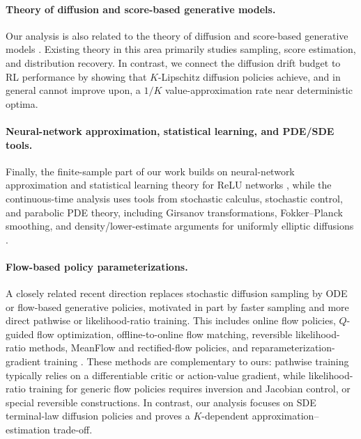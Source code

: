 \documentclass{article}
\newcommand{\1}{\mathbbm{1}}
\numberwithin{equation}{section}
\begin{document}
\paragraph{Theory of diffusion and score-based generative models.}
Our analysis is also related to the theory of diffusion and score-based
generative models
\cite{sohl2015deep, song2019generative, ho2020denoising,
song2021scorebased, tzen2019deep, deBortoli2022convergence,
lee2022convergence, chen2023sampling, chen2023score}. Existing theory in this
area primarily studies sampling, score estimation, and distribution recovery.
In contrast, we connect the diffusion drift budget to RL performance by showing
that $K$-Lipschitz diffusion policies achieve, and in general cannot improve
upon, a $1/K$ value-approximation rate near deterministic optima.




\paragraph{Neural-network approximation, statistical learning, and PDE/SDE tools.}
Finally, the finite-sample part of our work builds on neural-network
approximation and statistical learning theory for ReLU networks
\cite{yarotsky2017error, petersen2018optimal, schmidt2020nonparametric,
bartlett2019nearly, ou2024covering}, while the continuous-time analysis uses tools from stochastic calculus, stochastic control, and parabolic PDE
theory, including Girsanov transformations, Fokker--Planck smoothing, and
density/lower-estimate arguments for uniformly elliptic diffusions
\cite{stroockvaradhan1979multidimensional, karatzas1991brownian,
oksendal2003stochastic,
Krylov2021Ldplus1, 
bogachev2015fokker,
aronson1967bounds, kazamaki2006continuous, carmona2016lectures,
hajek1985mean}.

\paragraph{Flow-based policy parameterizations.}
A closely related recent direction replaces stochastic diffusion sampling by ODE or flow-based generative policies, motivated in part by faster sampling and more direct pathwise or likelihood-ratio training. This includes online flow policies, \(Q\)-guided flow optimization, offline-to-online flow matching, reversible likelihood-ratio methods, MeanFlow and rectified-flow policies, and reparameterization-gradient training \cite{lyu2025flowrl,doo2026qflow,shin2026fino,hu2026genpoplusplus,dong2026mfpo,kim2026som,zhou2026trfp,zhong2026rfo}. These methods are complementary to ours: pathwise training typically relies on a differentiable critic or action-value gradient, while likelihood-ratio training for generic flow policies requires inversion and Jacobian control, or special reversible constructions. In contrast, our analysis focuses on SDE terminal-law diffusion policies and proves a \(K\)-dependent approximation--estimation trade-off.
\end{document}

